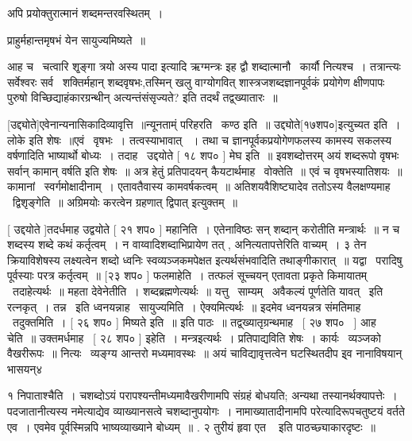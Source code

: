 \documentclass[11pt, openany]{book}
\begin{document}
अपि प्रयोक्तुरात्मानं शब्दमन्तरवस्थितम्~। 

प्राहुर्महान्तमृषभं येन सायुज्यमिष्यते~॥ 

आह च \textendash\ चत्वारि शृ्ङ्गा त्रयो अस्य पादा इत्यादि ऋग्मन्त्रः इह द्वौ
शब्दात्मानौ \textendash\ कार्यौ नित्यश्च~। तत्रान्त्यः सर्वेश्वरः सर्व \textendash\ शक्तिर्महान्
शब्दवृषभः,तस्मिन् खलु वाग्योगवित् शास्त्रजशब्दज्ञानपूर्वकं प्रयोगेण
क्षीणपापः पुरुषो विच्छिद्याहंकारग्रन्थीन् अत्यन्तंसंसृज्यते? इति तदर्थं
तद्व्ख्यातारः~॥



 [उद्द्योते]एवेनान्यनासिकादिव्यावृत्ति~॥न्यूनताम्ं परिहरति \textendash\ कण्ठ
इति~॥ उद्द्योते[१७शप०]इत्युच्यत इति~। लोके इति
शेषः~॥एवं \textendash\ वृषभः~। तत्वस्याभावात् ~। तथा च
ज्ञानपूर्वकप्रयोगेणफलस्य कामस्य सकलस्य वर्षणादिति भाष्यार्थो
बोध्यः~। तदाह \textendash\ उद्दयोते [ १८ शप० ] मेघ इति~॥ इवशब्दोत्तरम् अयं
शब्दरूपो वृषभः सर्वान् कामान् वर्षति इति शेषः~॥ अत्र हेतुं
प्रतिपादयन् कैयटार्थमाह \textendash\ वोक्तेति~॥ एवं च वृषभस्यातिशयः~॥
कामानां \textendash\ स्वर्गमोक्षादीनाम्~। एतावतैवास्य कामवर्षकत्वम्~॥
अतिशयवैशिष्ट्यादेव ततोऽस्य वैलक्षण्यमाह \textendash\ द्विशृङ्गेति~॥ अग्रिमयोः
करत्वेन ग्रहणात् {\qt द्विपात्} इत्युक्तम्~॥ 

 [ उद्दयोते ]तदर्धमाह उद्वयोते [ २१ शप० ] महानिति~। 
एतेनाविष्ठः सन् शब्दान् करोतीति मन्त्रार्थः~॥ न च शब्दस्य शब्दे कथं
कर्तृत्वम्~। न वाय्वादिशब्दाभिप्रायेण तत् , अनित्यतापत्तेरिति वाच्यम्~। ३
तेन क्रियाविशेषस्य लक्ष्यत्वेन शब्दो ध्वनिः स्वव्यञ्जकमपेक्षत
इत्यर्थसंभवादिति तथाङ्गीकारात्~॥ यद्वा \textendash\ परादिषु पूर्वस्याः परत्र
कर्तृत्वम्~॥ [२३ शप० ] फलमाहेति~। तत्फलं सूच्चयन् एतावता प्रकृते
किमायातम् \textendash\ तदाहेत्यर्थः~॥ महता देवेनेतीति~। शब्दब्रह्मणेत्यर्थः~॥
यत्तु \textendash\ साम्यम् \textendash\ अवैकल्यं पूर्णतेति यावत् \textendash\ इति रत्नकृत्~। तन्न \textendash\ इति
ध्वनयन्नाह \textendash\ सायुज्यमिति~। ऐक्यमित्यर्थः~॥ इदमेव ध्वनयन्नत्र
संमतिमाह \textendash\ तदुक्तमिति~। [ २६ शप० ] मिष्यते इति~॥ इति पाठः~॥
तद्व्ख्यातृग्रन्थमाह \textendash\ [ २७ शप० \textendash\ ] आह चेति~॥ उक्तमर्धमाह \textendash\ [ २८
शप० ] इहेति~। मन्त्रइत्यर्थः~। प्रतिपाद्यविति शेषः~। कार्यः \textendash\ व्यञ्जको
वैखरीरूपः~॥ नित्यः \textendash\ व्यङ्ग्य आन्तरो मध्यमावस्थः~॥ अयं
चाविद्यावृत्तत्वेन घटस्थितदीप इ्व नानाविषयान् भासयन्४



१ निपाताश्चैति~। चशब्दोऽयं परापश्यन्तीमध्यमावैखरीणामपि संग्रहं
बोधयति; अन्यथा तस्यानर्थक्यापत्तेः~। पदजातानीत्यस्य नमेत्याद्येव
व्याख्यानसत्वे चशब्दानुपयोगः~। नामाख्यातादीनामपि परेत्यादिरूपचतुष्टयं
वर्तते एव~। एवमेव पूर्वस्मिन्नपि भाष्यव्याख्याने बोध्यम्~॥ . २ {\qt तुरीयं
हृवा एत \textendash\ } इति पाठच्छ्याकारदृष्टः~॥ 
\end{document}
